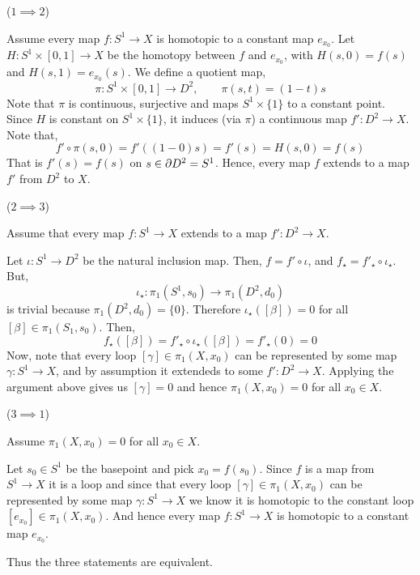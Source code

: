 \documentclass[12pt]{article}
\begin{document}
\begin{solution}
    \bbni
    \begin{center}
        \end{center}

    ($1 \implies 2$) 

    Assume every map $f: S^1 \to X$ is homotopic to a constant map $e_{x_0}$. Let $H: S^1 \times [0,1] \to X$ be the homotopy between $f$ and $e_{x_0}$, with $H(s, 0) = f(s)$ and $H(s, 1) = e_{x_0}(s)$. We define a quotient map, 
    \[\pi: S^1 \times [0,1] \to D^2, \qquad \pi(s, t) = (1-t)s\] 
    Note that $\pi$ is continuous, surjective and maps $S^1 \times \{1\}$ to a constant point. Since $H$ is constant on $S^1 \times \{1\}$, it induces (via $\pi$) a continuous map $f': D^2 \to X$. 
    Note that, 
    \[f'\circ \pi(s, 0) = f'((1-0)s) = f'(s) = H(s, 0) = f(s)\]
    That is $f'(s) = f(s)$ on $s \in \partial D^2 = S^1$. Hence, every map $f$ extends to a map $f'$ from $D^2$ to $X$. 

    \bbni

    ($2 \implies 3$)

    Assume that every map $f: S^1 \to X$ extends to a map $f': D^2 \to X$. 

    Let $\iota: S^1 \to D^2$ be the natural inclusion map. Then, $f = f' \circ \iota$, and $f_\star  = f'_\star \circ \iota_\star$. But, 
    \[\iota_\star: \pi_1(S^1, s_0) \to \pi_1(D^2, d_0)\]
    is trivial because $\pi_1(D^2, d_0) = \{0\}$. Therefore $\iota_\star([\beta]) = 0$ for all $[\beta] \in \pi_1(S_1, s_0)$. Then, 
    \[f_\star([\beta]) = f'_\star \circ \iota_\star ([\beta]) = f'_\star(0) = 0\]
    Now, note that every loop $[\gamma] \in \pi_1(X, x_0)$ can be represented by some map $\gamma: S^1 \to X$, and by assumption it extendeds to some $f': D^2 \to X$. Applying the argument above gives us $[\gamma] = 0$ and hence $\pi_1(X, x_0) = 0$ for all $x_0 \in X$. 

    \bbni

    ($3 \implies 1$) 

    Assume $\pi_1(X, x_0) = 0$ for all $x_0 \in X$. 

    Let $s_0 \in S^1$ be the basepoint and pick $x_0 = f(s_0)$. Since $f$ is a map from $S^1 \to X$ it is a loop and since that every loop $[\gamma] \in \pi_1(X, x_0)$ can be represented by some map $\gamma: S^1 \to X$ we know it is homotopic to the constant loop $[e_{x_0}] \in \pi_1(X, x_0)$. And hence every map $f: S^1 \to X$ is homotopic to a constant map $e_{x_0}$.

    Thus the three statements are equivalent. 
\end{solution}
\end{document}
